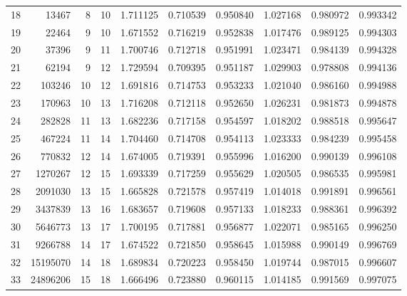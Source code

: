 \documentclass[12pt]{amsart}
\begin{document}
\begin{table}
{\begin{tabular}{|r|rrrrrrrrr|}
\\
18 &13467 
& 8
& 10
&  1.711125 & 0.710539 &0.950840	
& 1.027168 & 0.980972 &0.993342	

\\
19 &22464 
& 9
& 10
&  1.671552 & 0.716219 &0.952838	
& 1.017476 & 0.989125 &0.994303	

\\
20 &37396 
& 9
& 11
&  1.700746 & 0.712718 &0.951991	
& 1.023471 & 0.984139 &0.994328	

\\
21 &62194 
& 9
& 12
&  1.729594 & 0.709395 &0.951187	
& 1.029903 & 0.978808 &0.994136	

\\
22 &103246 
& 10
& 12
&  1.691816 & 0.714753 &0.953233	
& 1.021040 & 0.986160 &0.994988	

\\
23 &170963 
& 10
& 13
&  1.716208 & 0.712118 &0.952650	
& 1.026231 & 0.981873 &0.994878	

\\
24 &282828 
& 11
& 13
&  1.682236 & 0.717158 &0.954597	
& 1.018202 & 0.988518 &0.995647	

\\
25 &467224 
& 11
& 14
&  1.704460 & 0.714708 &0.954113	
& 1.023333 & 0.984239 &0.995458	

\\
26 &770832 
& 12
& 14
&  1.674005 & 0.719391 &0.955996	
& 1.016200 & 0.990139 &0.996108	

\\
27 &1270267 
& 12
& 15
&  1.693339 & 0.717259 &0.955629	
& 1.020505 & 0.986535 &0.995981	

\\
28 &2091030 
& 13
& 15
&  1.665828 & 0.721578 &0.957419	
& 1.014018 & 0.991891 &0.996561	

\\
29 &3437839 
& 13
& 16
&  1.683657 & 0.719608 &0.957133	
& 1.018233 & 0.988361 &0.996392	

\\
30 &5646773 
& 13
& 17
&  1.700195 & 0.717881 &0.956877	
& 1.022071 & 0.985165 &0.996250	

\\
31 &9266788 
& 14
& 17
&  1.674522 & 0.721850 &0.958645	
& 1.015988 & 0.990149 &0.996769	

\\
32 &15195070 
& 14
& 18
&  1.689834 & 0.720223 &0.958450	
& 1.019744 & 0.987015 &0.996607	

\\
33 &24896206 
& 15
& 18
&  1.666496 & 0.723880 &0.960115	
& 1.014185 & 0.991569 &0.997075	


\end{tabular}}
\end{table}
\end{document}
